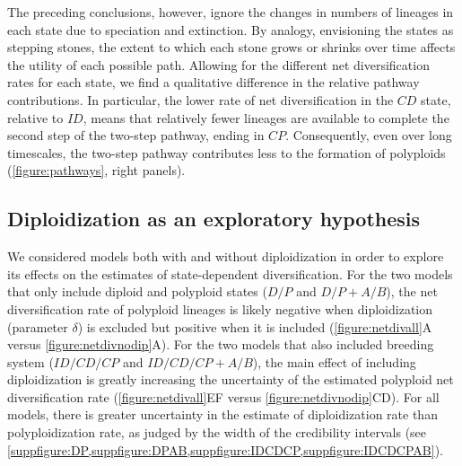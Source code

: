 The preceding conclusions, however, ignore the changes in numbers of lineages in each state due to speciation and extinction.
By analogy, envisioning the states as stepping stones, the extent to which each stone grows or shrinks over time affects the utility of each possible path.
Allowing for the different net diversification rates for each state, we find a qualitative difference in the relative pathway contributions.
In particular, the lower rate of net diversification in the $CD$ state, relative to $ID$, means that relatively fewer lineages are available to complete the second step of the two-step pathway, ending in $CP$.
Consequently, even over long timescales, the two-step pathway contributes less to the formation of polyploids (\cref{figure:pathways}, right panels).

\subsection{Diploidization as an exploratory hypothesis}

We considered models both with and without diploidization in order to explore its effects on the estimates of state-dependent diversification.
For the two models that only include diploid and polyploid states ($D/P$ and $D/P+A/B$), the net diversification rate of polyploid lineages is likely negative when diploidization (parameter $\delta$) is excluded but positive when it is included (\cref{figure:netdivall}A versus \cref{figure:netdivnodip}A).
For the two models that also included breeding system ($ID/CD/CP$ and $ID/CD/CP+A/B$), the main effect of including diploidization is greatly increasing the uncertainty of the estimated polyploid net diversification rate (\cref{figure:netdivall}EF versus \cref{figure:netdivnodip}CD).
For all models, there is greater uncertainty in the estimate of diploidization rate than polyploidization rate, as judged by the width of the credibility intervals (see \cref{suppfigure:DP,suppfigure:DPAB,suppfigure:IDCDCP,suppfigure:IDCDCPAB}).

